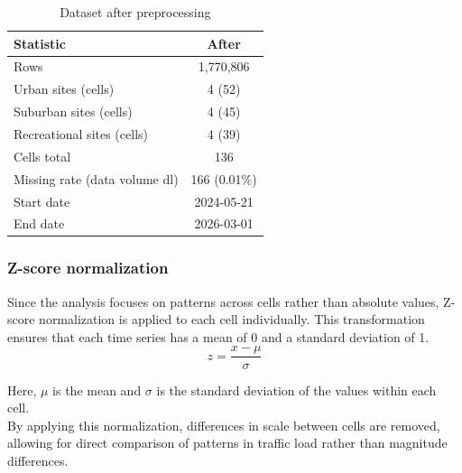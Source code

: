 \begin{table}[h]
\centering
\caption{Dataset after preprocessing}
\begin{tabular}{lc}
\hline
\textbf{Statistic} & \textbf{After} \\
\hline
Rows & 1,770,806 \\
Urban sites (cells) & 4 (52) \\
Suburban sites (cells) & 4 (45) \\
Recreational sites (cells) & 4 (39) \\
Cells total & 136 \\
Missing rate (data volume dl) & 166 (0.01\%) \\
Start date & 2024-05-21 \\
End date & 2026-03-01 \\
\hline
\end{tabular}
\end{table}

\subsubsection{Z-score normalization}

Since the analysis focuses on patterns across cells rather than absolute values, Z-score normalization is applied to each cell individually. This transformation ensures that each time series has a mean of 0 and a standard deviation of 1. \\

\begin{equation}
z = \frac{x - \mu}{\sigma}
\end{equation}

Here, $\mu$ is the mean and $\sigma$ is the standard deviation of the values within each cell. \\

By applying this normalization, differences in scale between cells are removed, allowing for direct comparison of patterns in traffic load rather than magnitude differences. \\

